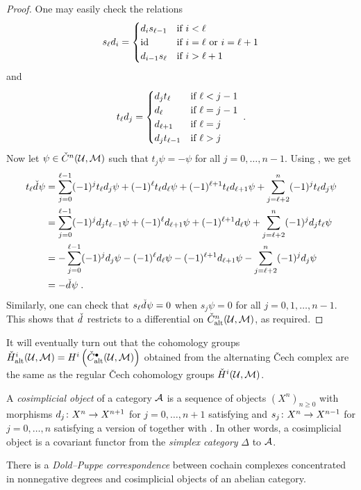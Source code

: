 \documentclass[a4paper,parskip=half,numbers=enddot, DIV=12]{scrreprt}
\newcommand{\vC}{\v{C}}
\begin{document}
\begin{proof}
		One may easily check the relations
		\begin{align}\lbl{eq:cosimplicialDegeneracies}
			s_\ell d_i=\begin{cases}
				d_is_{\ell-1} & \text{if }i<\ell\\
				\id &  \text{if }i=\ell\text{ or }i=\ell+1\\
				d_{i-1}s_\ell &  \text{if }i>\ell+1
			\end{cases}
		\end{align}
		and
		\begin{align}\lbl{eq:transpositions}
			t_\ell d_j=\begin{cases}
				d_jt_{\ell} & \text{if }\ell<j-1\\
				d_\ell &  \text{if }\ell=j-1\\
				d_{\ell+1} &  \text{if }\ell=j\\
				d_jt_{\ell-1} & \text{if }\ell>j
			\end{cases}\;.
		\end{align}
		Now let $\psi\in\check{C}^n(\mathcal{U},\mathcal{M})$ such that $t_j\psi=-\psi$ for all $j=0,\ldots,n-1$. Using , we get
		\begin{align*}
			t_\ell\check{d}\hspace{0.06125em}\psi&=\sum_{j=0}^{\ell-1}(-1)^jt_\ell d_j\psi+(-1)^\ell t_\ell d_\ell\psi+(-1)^{\ell+1} t_\ell d_{\ell+1}\psi+\sum_{j=\ell+2}^n(-1)^jt_\ell d_j\psi\\
			&=\sum_{j=0}^{\ell-1}(-1)^jd_jt_{\ell-1}\psi+(-1)^\ell d_{\ell+1}\psi+(-1)^{\ell+1} d_\ell\psi+\sum_{j=\ell+2}^{n}(-1)^j d_jt_\ell\psi\\
			&=-\sum_{j=0}^{\ell-1}(-1)^jd_j\psi-(-1)^\ell d_\ell\psi-(-1)^{\ell+1} d_{\ell+1}\psi-\sum_{j=\ell+2}^{n}(-1)^j d_j\psi\\
			&=-\check{d}\hspace{0.06125em}\psi\;.
		\end{align*}
		Similarly, one can check that $s_\ell\check{d}\hspace{0.06125em}\psi=0$ when $s_j\psi=0$ for all $j=0,1,\ldots,n-1$. This shows that $\check{d}\hspace{0.06125em}$ restricts to a differential on $\check{C}_{\mathrm{alt}}
		^n(\mathcal{U},\mathcal{M})$, as required.
	\end{proof}
	It will eventually turn out that the cohomology groups $\check{H}_{\mathrm{alt}}^i(\mathcal{U},\mathcal{M})=H^i\left(\check{C}_{\mathrm{alt}}^\bullet (\mathcal{U},\mathcal{M})\right)$ obtained from the alternating \vC ech complex are the same as the regular \vC ech cohomology groups $\check{H}^i(\mathcal{U},\mathcal{M})$.
\begin{rem}
	A \emph{cosimplicial object} of a category $\mathcal{A}$ is a sequence of objects $(X^n)_{n\geq 0}$ with morphisms $d_j\colon X^n\morphism X^{n+1}$ for $j=0,\ldots,n+1$ satisfying  and $s_j\colon X^n\morphism X^{n-1}$ for $j=0,\ldots,n$ satisfying a version of  together with . In other words, a cosimplicial object is a covariant functor from the \emph{simplex category} $\Delta$ to $\mathcal{A}$.
	
	There is a \emph{Dold--Puppe correspondence} between cochain complexes concentrated in nonnegative degrees and cosimplicial objects of an abelian category.  
\end{rem}
\end{document}
